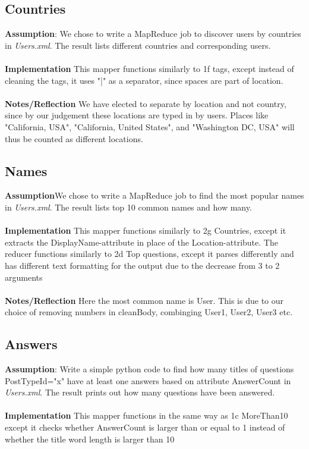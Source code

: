 \documentclass[fleqn,10pt]{wlscirep}
\begin{document}
\subsection{Countries}
\textbf{Assumption}: We chose to write a MapReduce job to discover users by countries in \textit{Users.xml}. The result lists different countries and corresponding users. \\ \\
\textbf{Implementation} This mapper functions similarly to 1f tags, except instead of cleaning the tags, it uses "|" as a separator, since spaces are part of location. \\ \\
\textbf{Notes/Reflection} We have elected to separate by location and not country, since by our judgement these locations are typed in by users. Places like "California, USA", "California, United States", and "Washington DC, USA" will thus be counted as different locations.


\subsection{Names}
\textbf{Assumption}We chose to write a MapReduce job to find the most popular names in \textit{Users.xml}. The result lists top 10 common names and how many.  \\ \\
\textbf{Implementation} This mapper functions similarly to 2g Countries, except it extracts the DisplayName-attribute in place of the Location-attribute. The reducer functions similarly to 2d Top questions, except it parses differently and has different text formatting for the output due to the decrease from 3 to 2 arguments \\ \\
\textbf{Notes/Reflection} Here the most common name is User. This is due to our choice of removing numbers in cleanBody, combinging User1, User2, User3 etc.



\subsection{Answers }
\textbf{Assumption}: Write a simple python code to find how many titles of questions PostTypeId="x" have at least one answers based on attribute AnswerCount in \textit{Users.xml}. The result prints out how many questions have been answered.  \\ \\
\textbf{Implementation} This mapper functions in the same way as 1c MoreThan10 except it checks whether AnswerCount is larger than or equal to 1 instead of whether the title word length is larger than 10

\end{document}
